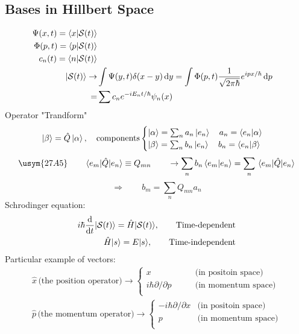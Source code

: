 \subsection{Bases in Hillbert Space}
\[\begin{aligned}
	\Psi(x,t) = \langle x|\mathcal{S}(t)\rangle \\
	\Phi(p,t) = \langle p|\mathcal{S}(t)\rangle \\
	c_n(t) = \langle n|\mathcal{S}(t)\rangle \\
	|\mathcal{S}(t)\rangle \rightarrow &\int\Psi(y,t)\delta(x-y)\,{\rm d}y
	= \int\Phi(p,t)\frac{1}{\sqrt{2\pi\hbar}}e^{ipx/\hbar}\,{\rm d}p \\
	= &\sum c_ne^{-iE_nt/\hbar}\psi_n(x)
\end{aligned}\]
Operator "Trandform"
\[\ket{\beta} = \hat{Q}\ket{\alpha}, \quad\text{components}\begin{cases}
	\ket{\alpha}=\sum_n a_n\ket{e_n} \quad a_n=\braket{e_n}{\alpha} \\
	\ket{\beta}=\sum_n b_n\ket{e_n} \quad b_n=\braket{e_n}{\beta}
\end{cases}\]
\[\usym{27A5} \qquad
\matrixel{e_m}{\hat{Q}}{e_n}\equiv Q_{mn} \qquad\rightarrow\sum_nb_n\braket{e_m}{e_n} = \sum_n\matrixel{e_m}{\hat{Q}}{e_n}\]
\[\Rightarrow\qquad b_m=\sum_nQ_{mn}a_n\]
Schrodinger equation:
\[
\begin{aligned}
	i\hbar\dv{t}|\mathcal{S}(t)\rangle = \hat{H} |\mathcal{S}(t)\rangle,\qquad \text{Time-dependent} \\
	\hat{H}|s\rangle = E|s\rangle,\qquad\text{Time-independent}
\end{aligned}       
\]
Particular example of vectors:
\[
\begin{aligned}
	\hat{x} \,\text{(the position operator)} \rightarrow \begin{cases}
		x  &\text{(in positoin space)}\\
		i\hbar\partial/\partial p  \qquad&\text{(in momentum space)}\\
	\end{cases} \\
	\hat{p} \,\text{(the momentum operator)} \rightarrow \begin{cases}
		-i\hbar\partial/\partial x  &\text{(in positoin space)}\\
		p  \qquad &\text{(in momentum space)}\\
	\end{cases}
\end{aligned}     
\]
